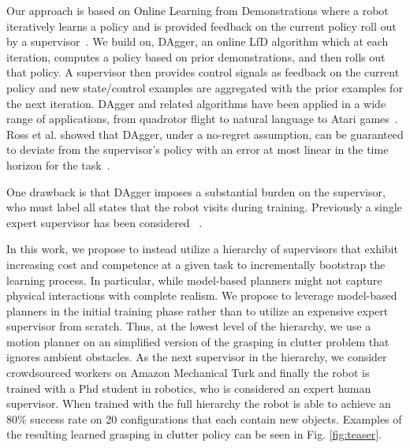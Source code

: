 \documentclass[10pt, conference]{ieeeconf}      %
\begin{document}
Our approach is based on Online Learning from Demonstrations where a robot iteratively learns a policy and is
provided feedback on the current policy roll out by a supervisor~\cite{grollman2007dogged,ross2010efficient,ross2010reduction}. 
We build on, DAgger, an online LfD algorithm which at each iteration, computes a policy based on prior demonstrations,
and then rolls out that policy. A supervisor then provides control signals as feedback on the current policy
and new state/control examples are aggregated with the prior examples for the next iteration. DAgger and related algorithms have been applied in a wide range of applications, from quadrotor flight to natural language to Atari games~\cite{NIPS2014_5421,duvallet2013imitation,ross2013learning}. 
Ross et al. showed that DAgger, under a no-regret assumption, can be guaranteed to deviate from the supervisor's policy with an error
at most linear in the time horizon for the task~\cite{ross2010reduction}.

One drawback is that DAgger imposes a substantial burden on the supervisor, who must label all states that the robot
visits during training.  Previously a single expert supervisor has been considered 
~\cite{ross2010efficient,ross2010reduction,ross2013learning,duvallet2013imitation}. 

In this work, we propose to instead
utilize a hierarchy of supervisors that exhibit increasing cost and competence at a given task to incrementally
bootstrap the learning process. In particular, while model-based planners might not capture physical interactions with
complete realism. We propose to leverage model-based planners in the initial training phase rather than to utilize an expensive
expert supervisor from scratch. Thus, at the lowest level of the hierarchy, we use a motion planner on an simplified
version of the grasping in clutter problem that ignores ambient obstacles. As the next supervisor in the hierarchy, 
we consider crowdsourced workers on Amazon Mechanical Turk and finally the robot is trained with a Phd student in
robotics, who is considered an expert human supervisor. When trained with the full hierarchy the robot is able to achieve an 80\% success rate on 20 configurations that each contain new objects. Examples of the resulting learned grasping in clutter policy can be seen in Fig. \ref{fig:teaser}. 

\end{document}
